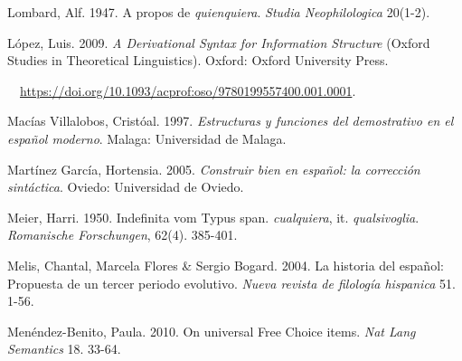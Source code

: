 \begin{styleStandard}
Lombard, Alf. 1947. A propos de \textit{quienquiera}. \textit{Studia Neophilologica} 20(1-2). 
\end{styleStandard}

\begin{styleStandard}
López, Luis. 2009. \textit{A Derivational Syntax for Information Structure} (Oxford Studies in Theoretical Linguistics). Oxford: Oxford University Press. 
\end{styleStandard}

\begin{styleStandard}
\ \ \url{https://doi.org/10.1093/acprof:oso/9780199557400.001.0001}. 
\end{styleStandard}

\begin{styleStandard}
Macías Villalobos, Cristóal. 1997. \textit{Estructuras y funciones del demostrativo en el español moderno}. Malaga: Universidad de Malaga.
\end{styleStandard}

\begin{styleStandard}
\end{styleStandard}

\begin{styleStandard}
Martínez García, Hortensia. 2005. \textit{Construir bien en español: la corrección sintáctica}. Oviedo: Universidad de Oviedo.
\end{styleStandard}

\begin{styleStandard}
Meier, Harri. 1950. Indefinita vom Typus span. \textit{cualquiera}, it. \textit{qualsivoglia}. \textit{Romanische Forschungen}, 62(4). 385-401.
\end{styleStandard}

\begin{styleStandard}
Melis, Chantal, Marcela Flores \& Sergio Bogard. 2004. La historia del español: Propuesta de un tercer periodo evolutivo. \textit{Nueva revista de filología hispanica} 51. 1-56.
\end{styleStandard}

\begin{styleStandard}
Menéndez-Benito, Paula. 2010. On universal Free Choice items. \textit{Nat Lang Semantics} 18. 33-64.
\end{styleStandard}

